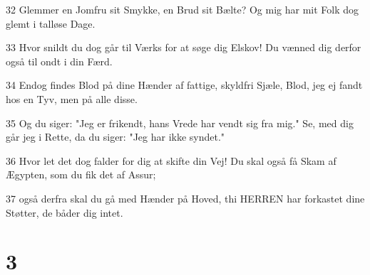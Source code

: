 \par 32 Glemmer en Jomfru sit Smykke, en Brud sit Bælte? Og mig har mit Folk dog glemt i talløse Dage.
\par 33 Hvor snildt du dog går til Værks for at søge dig Elskov! Du vænned dig derfor også til ondt i din Færd.
\par 34 Endog findes Blod på dine Hænder af fattige, skyldfri Sjæle, Blod, jeg ej fandt hos en Tyv, men på alle disse.
\par 35 Og du siger: "Jeg er frikendt, hans Vrede har vendt sig fra mig." Se, med dig går jeg i Rette, da du siger: "Jeg har ikke syndet."
\par 36 Hvor let det dog falder for dig at skifte din Vej! Du skal også få Skam af Ægypten, som du fik det af Assur;
\par 37 også derfra skal du gå med Hænder på Hoved, thi HERREN har forkastet dine Støtter, de båder dig intet.

\chapter{3}

